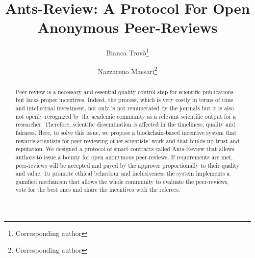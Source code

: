 \documentclass[runningheads]{llncs}
\begin{document}
%
\title{Ants-Review: A Protocol For Open Anonymous Peer-Reviews}
%
%
\author{Bianca Trovò\thanks{Corresponding author}\and
Nazzareno Massari\thanks{Corresponding author}}
%
%
%
\maketitle              %
%
\begin{abstract}
Peer-review is a necessary and essential quality control step for scientific publications but lacks proper  incentives. Indeed, the process, which is very costly in terms of time and intellectual investment, not only is not remunerated by the journals but it is also not openly recognized by the academic community as a relevant scientific output for a researcher. Therefore, scientific dissemination is affected in the timeliness, quality and fairness. Here, to solve this issue, we propose a blockchain-based incentive system that rewards scientists for peer-reviewing other scientists’ work and that builds up trust and reputation. We designed a protocol of smart contracts called Ants-Review that allows authors to issue a bounty for open anonymous peer-reviews. If requirements are met, peer-reviews will be accepted and payed by the approver proportionally to their quality and value. To promote ethical behaviour and inclusiveness the system implements a gamified mechanism that allows the whole community to evaluate the peer-reviews, vote for the best ones and share the incentives with the referees.
\end{abstract}
%
%
\end{document}

